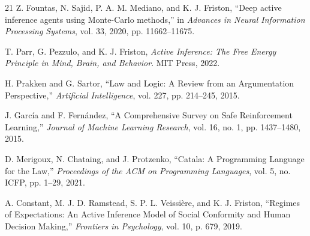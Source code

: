 \documentclass[10pt,twocolumn]{article}
\begin{document}
\begin{thebibliography}{21}
Z. Fountas, N. Sajid, P. A. M. Mediano, and K. J. Friston, ``Deep active inference agents using Monte-Carlo methods,'' in \textit{Advances in Neural Information Processing Systems}, vol. 33, 2020, pp. 11662--11675.

T. Parr, G. Pezzulo, and K. J. Friston, \textit{Active Inference: The Free Energy Principle in Mind, Brain, and Behavior}. MIT Press, 2022.

H. Prakken and G. Sartor, ``Law and Logic: A Review from an Argumentation Perspective,'' \textit{Artificial Intelligence}, vol. 227, pp. 214--245, 2015.

J. Garc\'{i}a and F. Fern\'{a}ndez, ``A Comprehensive Survey on Safe Reinforcement Learning,'' \textit{Journal of Machine Learning Research}, vol. 16, no. 1, pp. 1437--1480, 2015.

D. Merigoux, N. Chataing, and J. Protzenko, ``Catala: A Programming Language for the Law,'' \textit{Proceedings of the ACM on Programming Languages}, vol. 5, no. ICFP, pp. 1--29, 2021.

A. Constant, M. J. D. Ramstead, S. P. L. Veissi\`{e}re, and K. J. Friston, ``Regimes of Expectations: An Active Inference Model of Social Conformity and Human Decision Making,'' \textit{Frontiers in Psychology}, vol. 10, p. 679, 2019.

\end{thebibliography}
\end{document}
